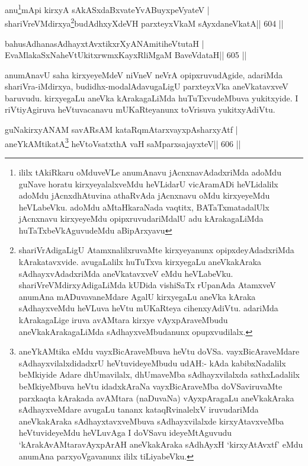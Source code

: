 \begin{shl}
anu\footnote{ililx tAkiRkaru oMduveVLe anumAnavu   jAcnxnavAdadxriMda adoMdu guNave horatu kirxyeyalalxveMdu heVLidarU   vicAramADi heVLidalilx adoMdu jAcnxdhAtuvina athaRvAda jAcnxnavu   oMdu kirxyeyeMdu heVLabeVku. adoMdu aMtaHkaraNada vaqtitx,   BATaTxmatadalUlx jAcnxnavu kirxyeyeMdu opipxruvudariMdalU adu   kArakagaLiMda huTaTxbeVkAguvudeMdu aBipArxyavu}mApi kirxyA sAkASxdaBxvateYvABuyxpeVyateV | shariVreVMdirxya\footnote{shariVrAdigaLigU AtamxnalilxruvaMte kirxyeyanunx   opipxdeyAdadxriMda kArakatavxvide. avugaLalilx huTuTxva kirxyegaLu   aneVkakAraka sAdhayxvAdadxriMda aneVkatavxveV eMdu heVLabeVku.   shariVreVMdirxyAdigaLiMda kUDida vishiSaTx rUpanAda AtamxveV   anumAna mADuvavaneMdare AgalU kirxyegaLu aneVka kAraka sAdhayxveMdu   heVLuva heVtu mUKaRteya cihenxyAdiVtu. adariMda kArakagaLige iruva   avAMtara kirxye vAyxpAraveMbudu aneVkakArakagaLiMda   sAdhayxveMbudanunx opupxvudilalx.}budAdhxyXdeVH parxteyxVkaM sAyxdaneVkatA\hfill || 604 ||
\end{shl}

\begin{shl}
bahusAdhanasAdhayxtAvxtikxrXyANAmitiheVtutaH |
EvaMlakaSxNaheVtUkitxrwmxKayxRliMgaM BaveVdataH\hfill || 605 ||
\end{shl}

\begin{artha}
anumAnavU saha kirxyeyeMdeV niVneV neVrA opipxruvudAgide, adariMda shariVra-iMdirxya, budidhx-modalAdavugaLigU parxteyxVka aneVkatavxveV baruvudu. kirxyegaLu aneVka kArakagaLiMda huTuTxvudeMbuva yukitxyide. I riVtiyAgiruva heVtuvacanavu mUKaRteyanunx toVrisuva yukitxyAdiVtu.
\end{artha}

\begin{shl}
guNakirxyANAM savARsAM kataRqmAtarxvayxpAsharxyAtf |
aneYkAMtikatA\footnote{aneYkAMtika eMdu vayxBicAraveMbuva heVtu doVSa. vayxBicAraveMdare sAdhayxvilalxdidadxrU heVtuvideyeMbudu udAH:- kAda kabibxNadalilx beMkiyide Adare dhUmavilalx, dhUmaveMba sAdhayxvilalxda sathxLadalilx beMkiyeMbuva heVtu idadxkAraNa vayxBicAraveMba doVSaviruvaMte parxkaqta kArakada avAMtara (naDuvaNa) vAyxpAragaLu aneVkakAraka sAdhayxveMdare avugaLu tananx kataqRvinalelxV iruvudariMda aneVkakAraka sAdhayxtavxveMbuva sAdhayxvilalxde kirxyAtavxveMba heVtuvideyeMdu heVLuvAga I doVSavu ideyeMtAguvudu `kArakAvAMtaravAyxpArAH aneVkakAraka sAdhAyxH `kirxyAtAvxtf' eMdu anumAna parxyoVgavanunx ililx tiLiyabeVku.} heVtoVsatxthA vaH saMparxsajayxteV\hfill || 606 ||
\end{shl}

